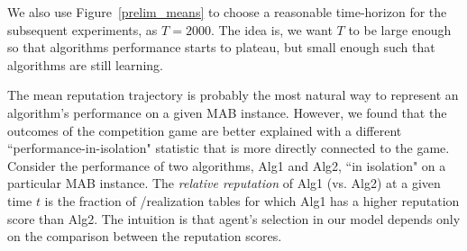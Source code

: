 \documentclass[../competing_bandits.tex]{subfiles}
\begin{document}
We also use Figure~\ref{prelim_means} to choose a reasonable time-horizon for the subsequent experiments, as $T=2000$. The idea is, we want $T$ to be large enough so that algorithms performance starts to plateau, but small enough such that algorithms are still learning.

The mean reputation trajectory is probably the most natural way to represent an algorithm's performance on a given MAB instance. However, we found that the outcomes of the competition game are better explained with a different ``performance-in-isolation" statistic that is more directly connected to the game. Consider the  performance of two algorithms, Alg1 and Alg2, ``in isolation" on a particular MAB instance. The \emph{relative reputation} of Alg1 (vs. Alg2) at a given time $t$ is the fraction of \MRVs /realization tables for which Alg1 has a higher reputation score than Alg2. The intuition is that agent's selection in our model depends only on the comparison between the reputation scores.
\end{document}
